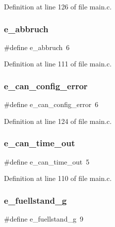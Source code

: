 Definition at line 126 of file main.\+c.

\mbox{\label{main_8c_a827c1113370e880ebc0db96f14b44c08}} 
\subsubsection{e\+\_\+abbruch}
{\footnotesize\ttfamily \#define e\+\_\+abbruch~6}



Definition at line 111 of file main.\+c.

\mbox{\label{main_8c_a8312bf824e019aacc256a09caddd0d1b}} 
\subsubsection{e\+\_\+can\+\_\+config\+\_\+error}
{\footnotesize\ttfamily \#define e\+\_\+can\+\_\+config\+\_\+error~6}



Definition at line 124 of file main.\+c.

\mbox{\label{main_8c_a1c7e2ae12eebe5e1efc4265ca91c7971}} 
\subsubsection{e\+\_\+can\+\_\+time\+\_\+out}
{\footnotesize\ttfamily \#define e\+\_\+can\+\_\+time\+\_\+out~5}



Definition at line 110 of file main.\+c.

\mbox{\label{main_8c_a3da7a50e30a478ff64fc41991aa67a2c}} 
\subsubsection{e\+\_\+fuellstand\+\_\+g}
{\footnotesize\ttfamily \#define e\+\_\+fuellstand\+\_\+g~9}




